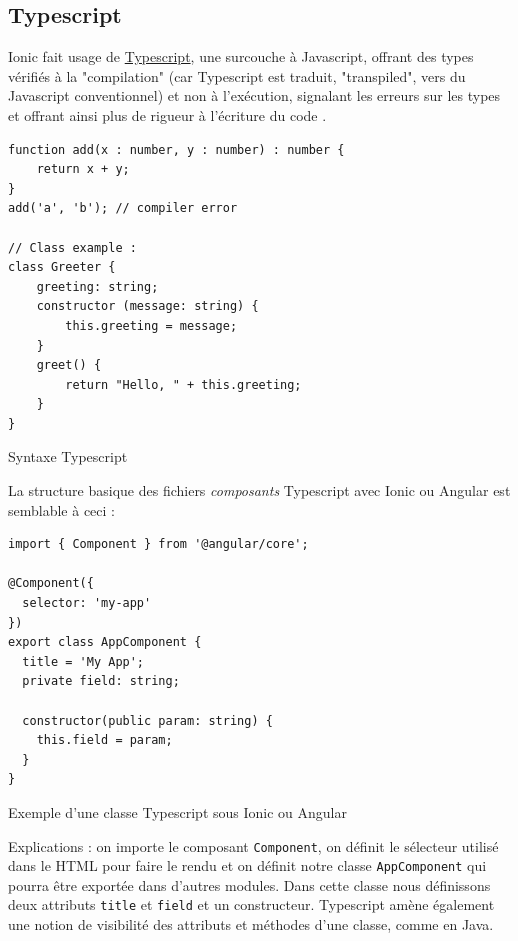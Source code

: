\documentclass[a4paper, 12pt]{article}
\newenvironment{code}{\captionsetup{type=listing}}{}
\begin{document}
\subsection{Typescript}
Ionic fait usage de \href{http://www.typescriptlang.org/}{Typescript}, une surcouche à Javascript, offrant des types
vérifiés à la "compilation" (car Typescript est traduit, "transpiled", vers du Javascript conventionnel) et non à
l'exécution, signalant les erreurs sur les types et offrant ainsi plus de rigueur à l'écriture du code \cite{ref12}. \\
\begin{code}
    \begin{verbatim}
function add(x : number, y : number) : number {
    return x + y;
}
add('a', 'b'); // compiler error

// Class example :
class Greeter {
    greeting: string;
    constructor (message: string) {
        this.greeting = message;
    }
    greet() {
        return "Hello, " + this.greeting;
    }
}
    \end{verbatim}
    \caption{Syntaxe Typescript}
\end{code}
\bigbreak
La structure basique des fichiers \textit{composants} Typescript avec Ionic ou Angular est semblable à ceci :
\\
\begin{code}
    \begin{verbatim}
import { Component } from '@angular/core';

@Component({
  selector: 'my-app'
})
export class AppComponent {
  title = 'My App';
  private field: string;

  constructor(public param: string) {
    this.field = param;
  }
}
    \end{verbatim}
    \caption{Exemple d'une classe Typescript sous Ionic ou Angular}
\end{code}
\bigbreak
Explications : on importe le composant \texttt{Component}, on définit le sélecteur utilisé dans le HTML
pour faire le rendu et on définit notre classe \texttt{AppComponent} qui pourra être exportée dans
d'autres modules. Dans cette classe nous définissons deux attributs \texttt{title} et
\texttt{field} et un constructeur. Typescript amène également une notion de visibilité des attributs
et méthodes d'une classe, comme en Java.
\end{document}
